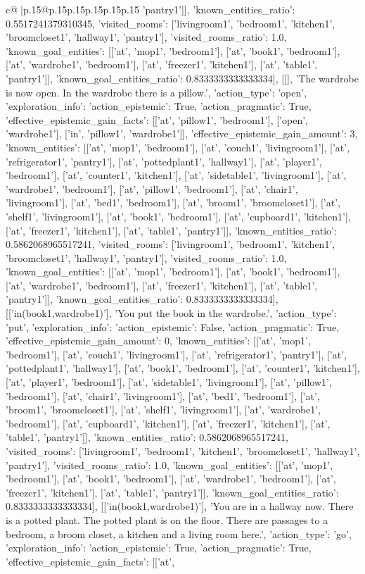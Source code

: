 \documentclass{article}
\begin{document}
{\begin{supertabular}{c@{$\;$}|p{.15\linewidth}@{}p{.15\linewidth}p{.15\linewidth}p{.15\linewidth}p{.15\linewidth}p{.15\linewidth}}
{{{'pantry1']], 'known_entities_ratio': 0.5517241379310345, 'visited_rooms': ['livingroom1', 'bedroom1', 'kitchen1', 'broomcloset1', 'hallway1', 'pantry1'], 'visited_rooms_ratio': 1.0, 'known_goal_entities': [['at', 'mop1', 'bedroom1'], ['at', 'book1', 'bedroom1'], ['at', 'wardrobe1', 'bedroom1'], ['at', 'freezer1', 'kitchen1'], ['at', 'table1', 'pantry1']], 'known_goal_entities_ratio': 0.8333333333333334}}], [[], 'The wardrobe is now open. In the wardrobe there is a pillow.', {'action_type': 'open', 'exploration_info': {'action_epistemic': True, 'action_pragmatic': True, 'effective_epistemic_gain_facts': [['at', 'pillow1', 'bedroom1'], ['open', 'wardrobe1'], ['in', 'pillow1', 'wardrobe1']], 'effective_epistemic_gain_amount': 3, 'known_entities': [['at', 'mop1', 'bedroom1'], ['at', 'couch1', 'livingroom1'], ['at', 'refrigerator1', 'pantry1'], ['at', 'pottedplant1', 'hallway1'], ['at', 'player1', 'bedroom1'], ['at', 'counter1', 'kitchen1'], ['at', 'sidetable1', 'livingroom1'], ['at', 'wardrobe1', 'bedroom1'], ['at', 'pillow1', 'bedroom1'], ['at', 'chair1', 'livingroom1'], ['at', 'bed1', 'bedroom1'], ['at', 'broom1', 'broomcloset1'], ['at', 'shelf1', 'livingroom1'], ['at', 'book1', 'bedroom1'], ['at', 'cupboard1', 'kitchen1'], ['at', 'freezer1', 'kitchen1'], ['at', 'table1', 'pantry1']], 'known_entities_ratio': 0.5862068965517241, 'visited_rooms': ['livingroom1', 'bedroom1', 'kitchen1', 'broomcloset1', 'hallway1', 'pantry1'], 'visited_rooms_ratio': 1.0, 'known_goal_entities': [['at', 'mop1', 'bedroom1'], ['at', 'book1', 'bedroom1'], ['at', 'wardrobe1', 'bedroom1'], ['at', 'freezer1', 'kitchen1'], ['at', 'table1', 'pantry1']], 'known_goal_entities_ratio': 0.8333333333333334}}], [['in(book1,wardrobe1)'], 'You put the book in the wardrobe.', {'action_type': 'put', 'exploration_info': {'action_epistemic': False, 'action_pragmatic': True, 'effective_epistemic_gain_amount': 0, 'known_entities': [['at', 'mop1', 'bedroom1'], ['at', 'couch1', 'livingroom1'], ['at', 'refrigerator1', 'pantry1'], ['at', 'pottedplant1', 'hallway1'], ['at', 'book1', 'bedroom1'], ['at', 'counter1', 'kitchen1'], ['at', 'player1', 'bedroom1'], ['at', 'sidetable1', 'livingroom1'], ['at', 'pillow1', 'bedroom1'], ['at', 'chair1', 'livingroom1'], ['at', 'bed1', 'bedroom1'], ['at', 'broom1', 'broomcloset1'], ['at', 'shelf1', 'livingroom1'], ['at', 'wardrobe1', 'bedroom1'], ['at', 'cupboard1', 'kitchen1'], ['at', 'freezer1', 'kitchen1'], ['at', 'table1', 'pantry1']], 'known_entities_ratio': 0.5862068965517241, 'visited_rooms': ['livingroom1', 'bedroom1', 'kitchen1', 'broomcloset1', 'hallway1', 'pantry1'], 'visited_rooms_ratio': 1.0, 'known_goal_entities': [['at', 'mop1', 'bedroom1'], ['at', 'book1', 'bedroom1'], ['at', 'wardrobe1', 'bedroom1'], ['at', 'freezer1', 'kitchen1'], ['at', 'table1', 'pantry1']], 'known_goal_entities_ratio': 0.8333333333333334}}], [['in(book1,wardrobe1)'], 'You are in a hallway now. There is a potted plant. The potted plant is on the floor. There are passages to a bedroom, a broom closet, a kitchen and a living room here.', {'action_type': 'go', 'exploration_info': {'action_epistemic': True, 'action_pragmatic': True, 'effective_epistemic_gain_facts': [['at', }}}
\end{supertabular}}
\end{document}
